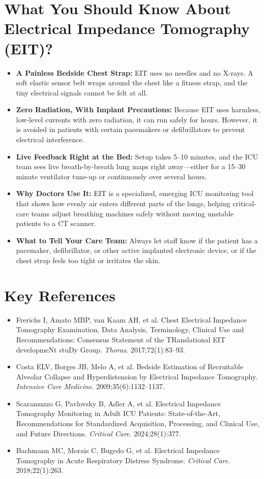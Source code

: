 \section{What You Should Know About Electrical Impedance Tomography (EIT)?}
\begin{itemize}
    \item \textbf{A Painless Bedside Chest Strap:} EIT uses no needles and no X-rays. A soft elastic sensor belt wraps around the chest like a fitness strap, and the tiny electrical signals cannot be felt at all.
    \item \textbf{Zero Radiation, With Implant Precautions:} Because EIT uses harmless, low-level currents with zero radiation, it can run safely for hours. However, it is avoided in patients with certain pacemakers or defibrillators to prevent electrical interference.
    \item \textbf{Live Feedback Right at the Bed:} Setup takes 5--10 minutes, and the ICU team sees live breath-by-breath lung maps right away---either for a 15--30 minute ventilator tune-up or continuously over several hours.
    \item \textbf{Why Doctors Use It:} EIT is a specialized, emerging ICU monitoring tool that shows how evenly air enters different parts of the lungs, helping critical-care teams adjust breathing machines safely without moving unstable patients to a CT scanner.
    \item \textbf{What to Tell Your Care Team:} Always let staff know if the patient has a pacemaker, defibrillator, or other active implanted electronic device, or if the chest strap feels too tight or irritates the skin.
\end{itemize}

\section{Key References}
\begin{itemize}
    \item Frerichs I, Amato MBP, van Kaam AH, et al. Chest Electrical Impedance Tomography Examination, Data Analysis, Terminology, Clinical Use and Recommendations: Consensus Statement of the TRanslational EIT developmeNt stuDy Group. \textit{Thorax}. 2017;72(1):83--93.
    \item Costa ELV, Borges JB, Melo A, et al. Bedside Estimation of Recruitable Alveolar Collapse and Hyperdistension by Electrical Impedance Tomography. \textit{Intensive Care Medicine}. 2009;35(6):1132--1137.
    \item Scaramuzzo G, Pavlovsky B, Adler A, et al. Electrical Impedance Tomography Monitoring in Adult ICU Patients: State-of-the-Art, Recommendations for Standardized Acquisition, Processing, and Clinical Use, and Future Directions. \textit{Critical Care}. 2024;28(1):377.
    \item Bachmann MC, Morais C, Bugedo G, et al. Electrical Impedance Tomography in Acute Respiratory Distress Syndrome. \textit{Critical Care}. 2018;22(1):263.
\end{itemize}
